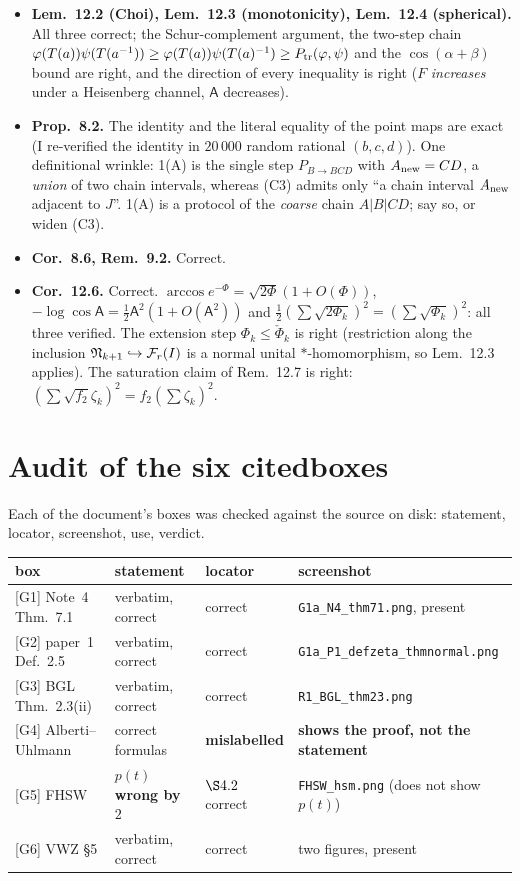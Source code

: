 \documentclass[11pt]{article}
\newcommand{\Fr}{\cF_r}
\newcommand{\Bang}{\mathsf A}
\theoremstyle{definition}\newtheorem{example}[theorem]{Example}
\begin{document}
\begin{itemize}[leftmargin=1.4em]
 such factors, not $1+z'$.  Worth one sentence.
\item \textbf{Lem.~12.2 (Choi), Lem.~12.3 (monotonicity), Lem.~12.4 (spherical).}  All
 three correct; the Schur-complement argument, the two-step chain
 $\varphi(T(a))\psi(T(a^{-1}))\ge\varphi(T(a))\psi(T(a)^{-1})\ge P_{\rm tr}(\varphi,\psi)$
 and the $\cos(\alpha+\beta)$ bound are right, and the direction of every inequality is
 right ($F$ \emph{increases} under a Heisenberg channel, $\Bang$ decreases).
\item \textbf{Prop.~8.2.}  The identity and the literal equality of the point maps are
 exact (I re-verified the identity in $20\,000$ random rational $(b,c,d)$).  One
 definitional wrinkle: 1(A) is the single step $P_{B\to BCD}$ with
 $A_{\rm new}=CD$, a \emph{union} of two chain intervals, whereas (C3) admits only ``a
 chain interval $A_{\rm new}$ adjacent to $J$''.  1(A) is a protocol of the \emph{coarse}
 chain $A|B|CD$; say so, or widen (C3).
\item \textbf{Cor.~8.6, Rem.~9.2.}  Correct.
\item \textbf{Cor.~12.6.}  Correct.  $\arccos e^{-\Phi}=\sqrt{2\Phi}(1+O(\Phi))$,
 $-\log\cos\Bang=\frac12\Bang^2(1+O(\Bang^2))$ and
 $\frac12(\sum\sqrt{2\Phi_k})^2=(\sum\sqrt{\Phi_k})^2$: all three verified.  The
 extension step $\Phi_k\le\check\Phi_k$ is right (restriction along the inclusion
 $\cN_{k+1}\hookrightarrow\Fr(I)$ is a normal unital $*$-homomorphism, so Lem.~12.3
 applies).  The saturation claim of Rem.~12.7 is right:
 $(\sum\sqrt{f_2}\zeta_k)^2=f_2(\sum\zeta_k)^2$.
\end{itemize}


\section{Audit of the six citedboxes}\label{sec:cited}

Each of the document's boxes was checked against the source on disk: statement, locator,
screenshot, use, verdict.

\begin{center}\small
\begin{tabular}{@{}llll@{}}
\toprule
box & statement & locator & screenshot\\
\midrule
{[G1]} Note~4 Thm.~7.1 & verbatim, correct & correct & \texttt{G1a\_N4\_thm71.png}, present\\
{[G2]} paper~1 Def.~2.5 & verbatim, correct & correct & \texttt{G1a\_P1\_defzeta\_thmnormal.png}\\
{[G3]} BGL Thm.~2.3(ii) & verbatim, correct & correct & \texttt{R1\_BGL\_thm23.png}\\
{[G4]} Alberti--Uhlmann & correct formulas & \textbf{mislabelled} & \textbf{shows the proof,
 not the statement}\\
{[G5]} FHSW & \textbf{$p(t)$ wrong by $2$} & $\S4.2$ correct & \texttt{FHSW\_hsm.png} (does
 not show $p(t)$)\\
{[G6]} VWZ \S5 & verbatim, correct & correct & two figures, present\\
\bottomrule
\end{tabular}
\end{center}
\end{document}
